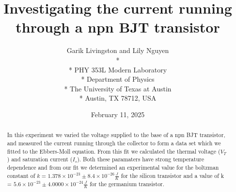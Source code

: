 \documentclass[12pt,letterpaper,onecolumn]{article}
\begin{document}

\title{Investigating the current running through a npn BJT transistor}

\author{
 Garik Livingston and Lily Nguyen \\*
  \\*
 PHY 353L Modern Laboratory \\*
 Department of Physics \\*
 The University of Texas at Austin \\*
 Austin, TX 78712, USA
}
\date{February 11, 2025}


\maketitle


\begin{abstract}
	In this experiment we varied the voltage supplied to the base of a npn BJT transistor, and measured the current running through the collector to form a data set which we fitted to the Ebbers-Moll equation.
	From this fit we calculated the thermal voltage ($V_T$) and saturation current ($I_s$). Both these paramaters have strong temperature dependence and from our fit we determined an experimental value for the boltzman constant of $k = 1.378 \times 10^{-23} \pm 8.4 \times 10^{-26} \frac{J}{K}$ for the silicon transistor and a value of k = $5.6 \times 10^{-23}\pm 4.0000 \times 10^{-24} \frac{J}{K}$ for the germanium transistor. 
	
\end{abstract}

\end{document}
